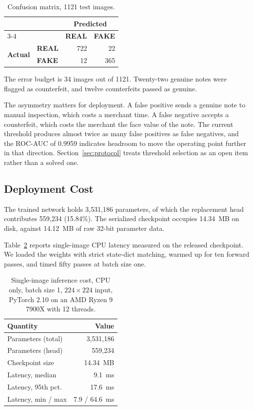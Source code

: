 \documentclass[conference]{IEEEtran}
\begin{document}
\begin{table}[t]
\caption{Confusion matrix, 1121 test images.}
\label{tab:cm}
\centering
\small
\begin{tabular}{@{}llrr@{}}
\toprule
& & \multicolumn{2}{c}{\textbf{Predicted}} \\
\cmidrule(l){3-4}
& & \textbf{REAL} & \textbf{FAKE} \\
\midrule
\multirow{2}{*}{\textbf{Actual}}
& \textbf{REAL} & 722 & 22 \\
& \textbf{FAKE} & 12  & 365 \\
\bottomrule
\end{tabular}
\end{table}

The error budget is 34 images out of 1121. Twenty-two genuine notes were flagged
as counterfeit, and twelve counterfeits passed as genuine.

The asymmetry matters for deployment. A false positive sends a genuine note to
manual inspection, which costs a merchant time. A false negative accepts a
counterfeit, which costs the merchant the face value of the note. The current
threshold produces almost twice as many false positives as false negatives, and
the ROC-AUC of 0.9959 indicates headroom to move the operating point further in
that direction. Section~\ref{sec:protocol} treats threshold selection as an
open item rather than a solved one.

\subsection{Deployment Cost}
\label{sec:cost}

The trained network holds 3{,}531{,}186 parameters, of which the replacement head
contributes 559{,}234 (15.84\%). The serialized checkpoint occupies 14.34~MB on
disk, against 14.12~MB of raw 32-bit parameter data.

Table~\ref{tab:latency} reports single-image CPU latency measured on the
released checkpoint. We loaded the weights with strict state-dict matching,
warmed up for ten forward passes, and timed fifty passes at batch size one.

\begin{table}[t]
\caption{Single-image inference cost, CPU only, batch size 1, $224 \times 224$
input, PyTorch 2.10 on an AMD Ryzen 9 7900X with 12 threads.}
\label{tab:latency}
\centering
\small
\begin{tabular}{@{}lr@{}}
\toprule
\textbf{Quantity} & \textbf{Value} \\
\midrule
Parameters (total)   & 3{,}531{,}186 \\
Parameters (head)    & 559{,}234 \\
Checkpoint size      & 14.34~MB \\
Latency, median      & 9.1~ms \\
Latency, 95th pct.   & 17.6~ms \\
Latency, min / max   & 7.9 / 64.6~ms \\
\bottomrule
\end{tabular}
\end{table}
\end{document}

